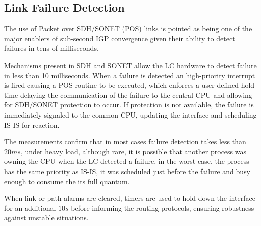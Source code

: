\documentclass[a4paper, 11pt, UTF8]{article}
\begin{document}
\subsection{Link Failure Detection}
The use of Packet over SDH/SONET (POS) links is pointed as being one of the major enablers of sub-second IGP convergence given their ability to detect failures in tens of milliseconds.

Mechanisms present in SDH and SONET allow the LC hardware to detect failure in less than 10 milliseconds.
When a failure is detected an high-priority interrupt is fired causing a POS routine to be executed,
which enforces a user-defined hold-time delaying the communication of the failure to the central CPU and allowing for SDH/SONET protection to occur.
If protection is not available, the failure is immediately signaled to the common CPU, updating the interface and scheduling IS-IS for reaction.

The measurements confirm that in most cases failure detection takes less than $20ms$, under heavy load, 
although rare, it is possible that another process was owning the CPU when the LC detected a failure,
in the worst-case, the process has the same priority as IS-IS, 
it was scheduled just before the failure and busy enough to consume the its full quantum.

When link or path alarms are cleared, 
timers are used to hold down the interface for an additional $10s$ before informing the routing protocols, 
ensuring robustness against unstable situations.



% 
% 
\end{document}
